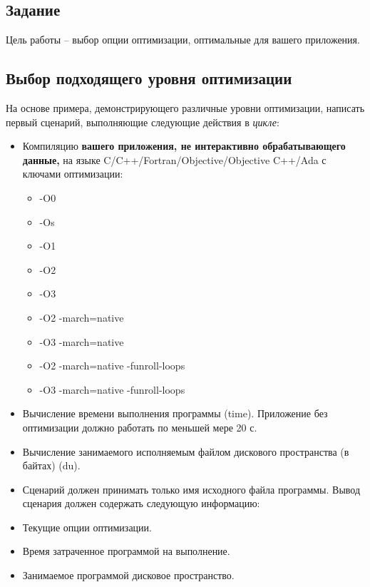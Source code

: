 \documentclass[a4paper, 12pt] {article}
\begin{document}
\newpage

\begin{center}
  \section{Задание}
\end{center}

Цель работы -- выбор опции оптимизации, оптимальные для вашего приложения.\bigskip

\subsection{Выбор подходящего уровня оптимизации}
  На основе примера, демонстрирующего различные уровни оптимизации,
написать первый сценарий, выполняющие следующие действия в \textit{цикле}:
\begin{itemize}
  \item Компиляцию \textbf{вашего приложения, не интерактивно
    обрабатывающего данные,} на языке
    C/C++/Fortran/Objective/Objective C++/Ada с ключами оптимизации:
  \begin{itemize}
    \item[\textopenbullet] -O0
    \item[\textopenbullet] -Os
    \item[\textopenbullet] -O1
    \item[\textopenbullet] -O2
    \item[\textopenbullet] -O3
    \item[\textopenbullet] -O2 -march=native
    \item[\textopenbullet] -O3 -march=native
    \item[\textopenbullet] -O2 -march=native -funroll-loops
    \item[\textopenbullet] -O3 -march=native -funroll-loops
  \end{itemize}
  \item Вычисление времени выполнения программы (time). Приложение без
    оптимизации должно работать по меньшей мере 20 с.
  \item Вычисление занимаемого исполняемым файлом дискового
    пространства (в байтах) (du).
  \item Сценарий должен принимать только имя исходного файла программы. Вывод сценария должен содержать следующую информацию:
  \item Текущие опции оптимизации.
  \item Время затраченное программой на выполнение.
  \item Занимаемое программой дисковое пространство.
\end{itemize}
\end{document}
